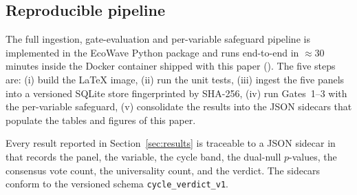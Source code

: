 \subsection{Reproducible pipeline}

The full ingestion, gate-evaluation and per-variable safeguard
pipeline is implemented in the EcoWave Python package and runs
end-to-end in \(\approx 30\) minutes inside the Docker container
shipped with this paper ().
The five steps are: (i) build the LaTeX image, (ii) run the unit
tests, (iii) ingest the five panels into a versioned SQLite store
fingerprinted by SHA-256, (iv) run Gates~1--3 with the per-variable
safeguard, (v) consolidate the results into the JSON sidecars that
populate the tables and figures of this paper.

Every result reported in Section~\ref{sec:results} is traceable to
a JSON sidecar in  that records the panel,
the variable, the cycle band, the dual-null \(p\)-values, the
consensus vote count, the universality count, and the verdict.
The sidecars conform to the versioned schema \texttt{cycle\_verdict\_v1}.
